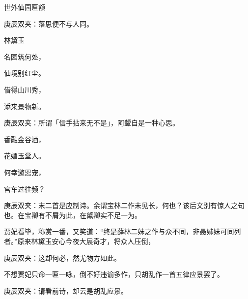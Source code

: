 \begin{poem}
    \begin{pl}世外仙园匾额\end{pl}
    \begin{note}庚辰双夹：落思便不与人同。\end{note}\begin{pl}林黛玉\end{pl}

    \begin{pl}名园筑何处，\end{pl}

    \begin{pl}仙境别红尘。\end{pl}

    \begin{pl}借得山川秀，\end{pl}

    \begin{pl}添来景物新。\end{pl}
    \begin{note}庚辰双夹：所谓「信手拈来无不是」，阿颦自是一种心思。\end{note}

    \begin{pl}香融金谷酒，\end{pl}

    \begin{pl}花媚玉堂人。\end{pl}

    \begin{pl}何幸邀恩宠，\end{pl}

    \begin{pl}宫车过往频？\end{pl}
    \begin{note}庚辰双夹：末二首是应制诗。余谓宝林二作未见长，何也？该后文别有惊人之句也。在宝卿有不屑为此，在黛卿实不足一为。\end{note}

\end{poem}


\begin{parag}
    贾妃看毕，称赏一番，又笑道：“终是薛林二妹之作与众不同，非愚姊妹可同列者。”原来林黛玉安心今夜大展奇才，将众人压倒，\begin{note}庚辰双夹：这却何必，然尤物方如此。\end{note}不想贾妃只命一匾一咏，倒不好违谕多作，只胡乱作一首五律应景罢了。\begin{note}庚辰双夹：请看前诗，却云是胡乱应景。\end{note}
\end{parag}


